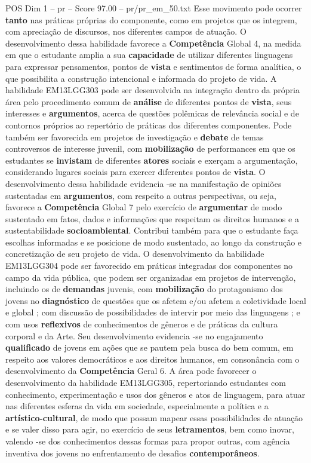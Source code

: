 \begin{textsample}{POS Dim 1 – pr – Score 97.00 – pr/pr\_em\_50.txt}
Esse movimento pode ocorrer \textbf{tanto} nas práticas próprias do componente, como em projetos que os integrem, com apreciação de discursos, nos diferentes campos de atuação.
O desenvolvimento dessa habilidade favorece a \textbf{Competência} Global 4, na medida em que o estudante amplia a sua \textbf{capacidade} de utilizar diferentes linguagens para expressar pensamentos, pontos de \textbf{vista} e sentimentos de forma analítica, o que possibilita a construção intencional e informada do projeto de vida.
A habilidade EM13LGG303 pode ser desenvolvida na integração dentro da própria área pelo procedimento comum de \textbf{análise} de diferentes pontos de \textbf{vista}, seus interesses e \textbf{argumentos}, acerca de questões polêmicas de relevância social e de contornos próprios ao repertório de práticas dos diferentes componentes.
Pode também ser favorecida em projetos de investigação e \textbf{debate} de temas controversos de interesse juvenil, com \textbf{mobilização} de performances em que os estudantes se \textbf{invistam} de diferentes \textbf{atores} sociais e exerçam a argumentação, considerando lugares sociais para exercer diferentes pontos de \textbf{vista}.
O desenvolvimento dessa habilidade evidencia -se na manifestação de opiniões sustentadas em \textbf{argumentos}, com respeito a outras perspectivas, ou seja, favorece a \textbf{Competência} Global 7 pelo exercício de \textbf{argumentar} de modo sustentado em fatos, dados e informações que respeitam os direitos humanos e a sustentabilidade \textbf{socioambiental}.
Contribui também para que o estudante faça escolhas informadas e se posicione de modo sustentado, ao longo da construção e concretização de seu projeto de vida.
O desenvolvimento da habilidade EM13LGG304 pode ser favorecido em práticas integradas dos componentes no campo da vida pública, que podem ser organizadas em projetos de intervenção, incluindo os de \textbf{demandas} juvenis, com \textbf{mobilização} do protagonismo dos jovens no \textbf{diagnóstico} de questões que os afetem e/ou afetem a coletividade local e global ; com discussão de possibilidades de intervir por meio das linguagens ; e com usos \textbf{reflexivos} de conhecimentos de gêneros e de práticas da cultura corporal e da Arte.
Seu desenvolvimento evidencia -se no engajamento \textbf{qualificado} de jovens em ações que se pautem pela busca do bem comum, em respeito aos valores democráticos e aos direitos humanos, em consonância com o desenvolvimento da \textbf{Competência} Geral 6.
A área pode favorecer o desenvolvimento da habilidade EM13LGG305, repertoriando estudantes com conhecimento, experimentação e usos dos gêneros e atos de linguagem, para atuar nas diferentes esferas da vida em sociedade, especialmente a política e a \textbf{artístico-cultural}, de modo que possam mapear essas possibilidades de atuação e se valer disso para agir, no exercício de seus \textbf{letramentos}, bem como inovar, valendo -se dos conhecimentos dessas formas para propor outras, com agência inventiva dos jovens no enfrentamento de desafios \textbf{contemporâneos}.

\end{textsample}
